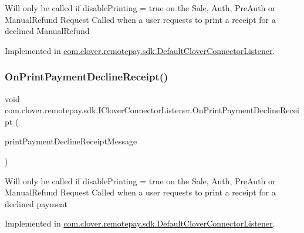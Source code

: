 Will only be called if disable\+Printing = true on the Sale, Auth, Pre\+Auth or Manual\+Refund Request Called when a user requests to print a receipt for a declined Manual\+Refund 



Implemented in \hyperlink{classcom_1_1clover_1_1remotepay_1_1sdk_1_1_default_clover_connector_listener_ad1ee83616c84ca13a0e02a3203d20f69}{com.\+clover.\+remotepay.\+sdk.\+Default\+Clover\+Connector\+Listener}.

\mbox{\label{interfacecom_1_1clover_1_1remotepay_1_1sdk_1_1_i_clover_connector_listener_a3f1e0e6bd2b019c4e1ecbbb39078d0a7}} 
\subsubsection{\texorpdfstring{On\+Print\+Payment\+Decline\+Receipt()}{OnPrintPaymentDeclineReceipt()}}
{\footnotesize\ttfamily void com.\+clover.\+remotepay.\+sdk.\+I\+Clover\+Connector\+Listener.\+On\+Print\+Payment\+Decline\+Receipt (\begin{DoxyParamCaption}\item[{\hyperlink{classcom_1_1clover_1_1remotepay_1_1sdk_1_1_print_payment_decline_receipt_message}{Print\+Payment\+Decline\+Receipt\+Message}}]{print\+Payment\+Decline\+Receipt\+Message }\end{DoxyParamCaption})}



Will only be called if disable\+Printing = true on the Sale, Auth, Pre\+Auth or Manual\+Refund Request Called when a user requests to print a receipt for a declined payment 



Implemented in \hyperlink{classcom_1_1clover_1_1remotepay_1_1sdk_1_1_default_clover_connector_listener_a5c37faa1b2fd5dfc6c5ea0aa85c32d50}{com.\+clover.\+remotepay.\+sdk.\+Default\+Clover\+Connector\+Listener}.

\mbox{\label{interfacecom_1_1clover_1_1remotepay_1_1sdk_1_1_i_clover_connector_listener_a487aca873c4e0bfa4222f9712f919efa}} 
